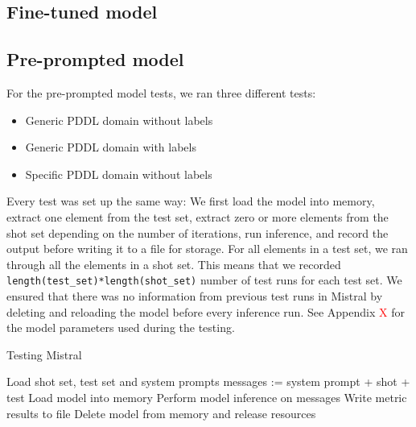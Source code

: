 \subsection{Fine-tuned model}

\subsection{Pre-prompted model}
For the pre-prompted model tests, we ran three different tests:

\begin{itemize}
    \item Generic PDDL domain without labels
    \item Generic PDDL domain with labels
    \item Specific PDDL domain without labels
\end{itemize}

Every test was set up the same way: We first load the model into memory, extract one element from the test set, extract zero or more elements from the shot set depending on the number of iterations, run inference, and record the output before writing it to a file for storage. For all elements in a test set, we ran through all the elements in a shot set. This means that we recorded \verb|length(test_set)*length(shot_set)| number of test runs for each test set. We ensured that there was no information from previous test runs in Mistral by deleting and reloading the model before every inference run. See Appendix \textcolor{red}{X} for the model parameters used during the testing.

\begin{algorithm}\label{alg:mistral_test}
    \caption{Testing Mistral}
    \begin{algorithmic}[1]
        \State Load shot set, test set and system prompts
                    \State messages := system prompt + shot + test
                    \State Load model into memory
                    \State Perform model inference on messages
                    \State Write metric results to file
                    \State Delete model from memory and release resources
                \EndFor
            \EndFor
        \EndFor
    \end{algorithmic}
\end{algorithm}


